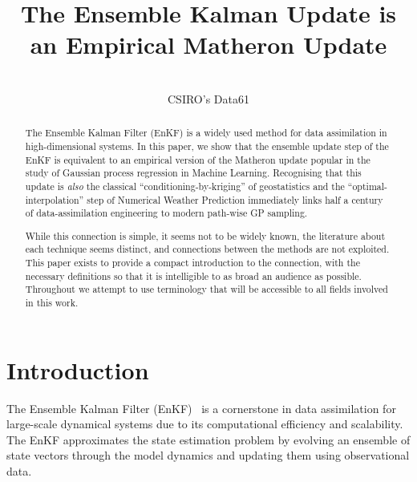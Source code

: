 \documentclass[wcp]{jmlr} %
\title[Ensemble Kalman Update]{The Ensemble Kalman Update is an Empirical Matheron Update}
\author{\Name{Dan MacKinlay\,\orcidlink{0000-0001-6077-2684}}\\
  \addr CSIRO's Data61}
\begin{document}



\maketitle

\begin{abstract}
The Ensemble Kalman Filter (EnKF) is a widely used method for data assimilation in high-dimensional systems.
In this paper, we show that the ensemble update step of the EnKF is equivalent to an empirical version of the Matheron update popular in the study of Gaussian process regression in Machine Learning.
Recognising that this update is \emph{also} the classical ``conditioning-by-kriging'' of geostatistics and the ``optimal-interpolation'' step of Numerical Weather Prediction immediately links half a century of data-assimilation engineering to modern path-wise GP sampling.

While this connection is simple, it seems not to be widely known, the literature about each technique seems distinct, and connections between the methods are not exploited.
This paper exists to provide a compact introduction to the connection, with the necessary definitions so that it is intelligible to as broad an audience as possible.
Throughout we attempt to use terminology that will be accessible to all fields involved in this work.
\end{abstract}

\section{Introduction}

The Ensemble Kalman Filter (EnKF)~\citep{Evensen2003Ensemble,Evensen2009Data} is a cornerstone in data assimilation for large-scale dynamical systems due to its computational efficiency and scalability.
The EnKF approximates the state estimation problem by evolving an ensemble of state vectors through the model dynamics and updating them using observational data.
\end{document}
